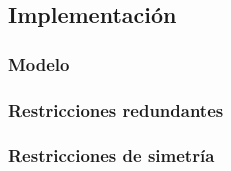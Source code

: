 
\subsection{Implementación}\label{sec:01-jobshop_mantenimiento-implementacion}

\subsubsection*{Modelo}

\subsubsection*{Restricciones redundantes}

\subsubsection*{Restricciones de simetría}
